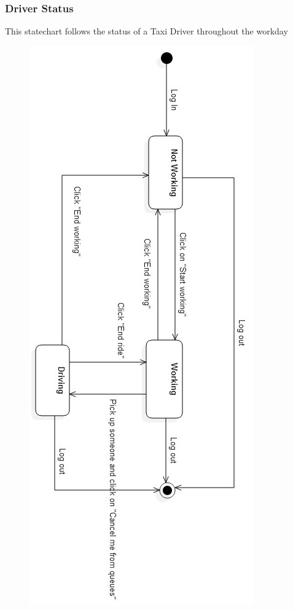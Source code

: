 \newpage
\subsubsection{Driver Status}

This statechart follows the status of a Taxi Driver throughout the workday

	\begin{figure}[h!]
		\centering
		\includegraphics[height=0.85\textheight]{"myTaxiServiceImg/SequenceDiagram/Driver Status"}
	\end{figure}

